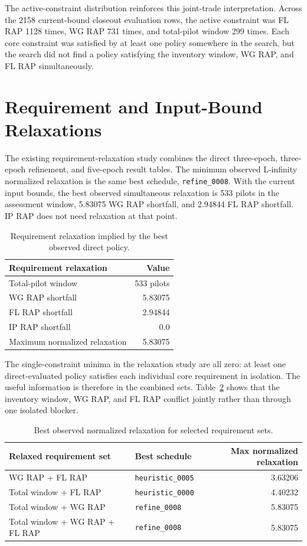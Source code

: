 \documentclass[10pt]{article}
\begin{document}
The active-constraint distribution reinforces this joint-trade interpretation.
Across the 2158 current-bound closeout evaluation rows, the active constraint
was FL RAP 1128 times, WG RAP 731 times, and total-pilot window 299 times. Each
core constraint was satisfied by at least one policy somewhere in the search,
but the search did not find a policy satisfying the inventory window, WG RAP,
and FL RAP simultaneously.

\section{Requirement and Input-Bound Relaxations}

The existing requirement-relaxation study combines the direct three-epoch,
three-epoch refinement, and five-epoch result tables. The minimum observed
L-infinity normalized relaxation is the same best schedule,
\texttt{refine\_0008}. With the current input bounds, the best observed
simultaneous relaxation is 533 pilots in the assessment window, 5.83075 WG RAP
shortfall, and 2.94844 FL RAP shortfall. IP RAP does not need relaxation at
that point.

\begin{table}[htbp]
\centering
\caption{Requirement relaxation implied by the best observed direct policy.}
\label{tab:req-relaxation}
\begin{tabular}{lr}
\toprule
Requirement relaxation & Value \\
\midrule
Total-pilot window & 533 pilots \\
WG RAP shortfall & 5.83075 \\
FL RAP shortfall & 2.94844 \\
IP RAP shortfall & 0.0 \\
Maximum normalized relaxation & 5.83075 \\
\bottomrule
\end{tabular}
\end{table}

The single-constraint minima in the relaxation study are all zero: at least one
direct-evaluated policy satisfies each individual core requirement in isolation.
The useful information is therefore in the combined sets. Table~\ref{tab:req-set-relaxation}
shows that the inventory window, WG RAP, and FL RAP conflict jointly rather
than through one isolated blocker.

\begin{table}[htbp]
\centering
\caption{Best observed normalized relaxation for selected requirement sets.}
\label{tab:req-set-relaxation}
\begin{tabular}{llr}
\toprule
Relaxed requirement set & Best schedule & Max normalized relaxation \\
\midrule
WG RAP + FL RAP & \texttt{heuristic\_0005} & 3.63206 \\
Total window + FL RAP & \texttt{heuristic\_0000} & 4.40232 \\
Total window + WG RAP & \texttt{refine\_0008} & 5.83075 \\
Total window + WG RAP + FL RAP & \texttt{refine\_0008} & 5.83075 \\
\bottomrule
\end{tabular}
\end{table}
\end{document}
